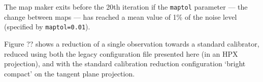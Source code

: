 \documentclass[twocolumn]{aastex6}
\newcommand{\um}{\micron}
\newcommand{\note}[1]{\textcolor{red}{Note: #1}}
\begin{document}
The map maker exits before the 20th iteration if the \texttt{maptol}
parameter --- the change between maps --- has reached a mean value of 1\%
of the noise level (specified by \texttt{maptol=0.01}).






Figure ?? shows a reduction of a single
observation towards a standard calibrator, reduced using both the
legacy configuration file presented here (in an HPX projection), and
with the standard calibration reduction configuration `bright compact'
on the tangent plane projection.

\end{document}
